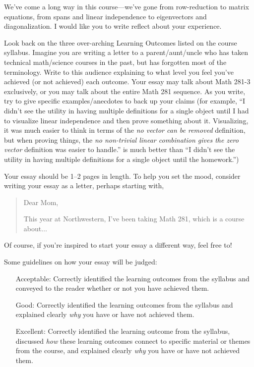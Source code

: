 \documentclass[letter]{article}
\newcommand{\setheader}[6]{
	\lhead{{\sc #1}\\{\sc #2} %
	}
	\rhead{
		{\bf #3} 
		\ifthenelse{\equal{#4}{}}{}{(#4)}\\
		{\bf #5} 
		\ifthenelse{\equal{#6}{}}{}{(#6)}%
	}
}
\begin{document}
	\setheader{Math 281-3}{Homework 9}{Due Monday, June 6}{}{}{}

		
			We've come a long way in this course---we've gone from row-reduction to matrix equations, from
			spans and linear independence to eigenvectors and diagonalization.  I would like you to
			write reflect about your experience.

			Look back on the three over-arching {\sc Learning Outcomes} listed on the course syllabus.
			Imagine you are writing a letter to a parent/aunt/uncle who has 
			taken technical math/science courses in
			the past, but has forgotten most of the terminology.  Write to this audience explaining
			to what level you feel you've achieved (or not achieved) each outcome.  Your essay
			may talk about Math 281-3 exclusively, or you may talk about the entire Math 281 sequence.
			As you write, try to give specific examples/anecdotes to back up your claims (for example, 
			``I didn't see the utility in having multiple definitions for a single object until
			I had to visualize linear independence and then prove something about it.  Visualizing, it was
			much easier to think in terms of the \emph{no vector can be removed} definition, but
			when proving things, the \emph{no non-trivial linear combination gives the zero vector}
			definition was easier to handle\mbox{.}'' is much better than ``I didn't see the utility in 
			having multiple definitions for a single object until the homework.'')


			Your essay should be 1--2 pages in length.  To help you set the mood, 
			consider writing your essay as a letter, perhaps starting with,
			\begin{quote}
				Dear Mom, 

				This year at Northwestern, I've been taking Math 281, which is a course about$\ldots$
			\end{quote}

			Of course, if you're inspired to start your essay a different way, feel free to!

			Some guidelines on how your essay will be judged:
			\begin{enumerate}
				\item[Acceptable:]
					Correctly identified the learning outcomes from the syllabus 
					and conveyed to the reader whether or not you have achieved them.
				\item[Good:]
					Correctly identified the learning outcomes from the syllabus
					and explained clearly \emph{why} you have or have not achieved them.
				\item[Excellent:]
					Correctly identified the learning outcome from the syllabus, 
					discussed \emph{how} these learning outcomes connect to specific material or themes from the course, 
					and explained clearly \emph{why} you have or have not achieved them.
			\end{enumerate}
\end{document}
